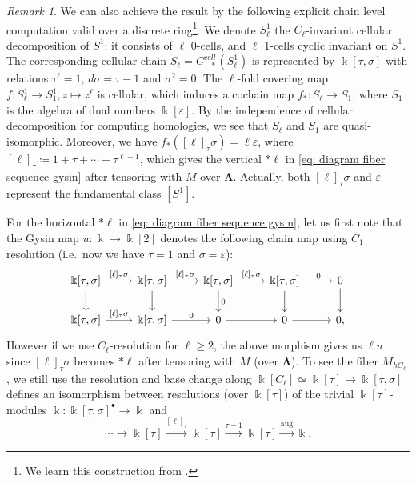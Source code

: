 \documentclass[11pt]{amsart}
\numberwithin{equation}{section}
\theoremstyle{plain}
\theoremstyle{definition}
\theoremstyle{remark}
\newtheorem{RMK}[rmk]{Remark}
\begin{document}
    \begin{RMK} 
    We can also achieve the result by the following explicit chain level computation valid over a discrete ring\footnote{We learn this construction from \cite[Proposition 5.3]{Chen1}.}. We denote $S^1_\ell$ the $C_\ell$-invariant cellular decomposition of $S^1$: it consists of $\ell$ 0-cells, and $\ell$ 1-cells cyclic invariant on $S^1$. The corresponding cellular chain $S_\ell=C_{-*}^{cell}(S^1_\ell)$ is represented by $\Bbbk[\tau,\sigma]$ with relations $\tau^\ell=1$, $d\sigma=\tau-1$ and $\sigma^2=0$. The $\ell$-fold covering map $f:S^1_\ell\rightarrow S^1_1, z\mapsto z^\ell$ is cellular, which induces a cochain map $f_*: S_\ell\rightarrow S_1$, where $S_1$ is the algebra of dual numbers $\Bbbk[\varepsilon]$. By the independence of cellular decomposition for computing homologies, we see that $S_\ell$ and $S_1$ are quasi-isomorphic. 
    Moreover, we have $f_*([\ell]_\tau\sigma)=\ell\varepsilon$, where $[\ell]_\tau\coloneqq 1+\tau+\cdots+\tau^{\ell-1}$, which gives the vertical $*\ell$ in \autoref{eq: diagram fiber sequence gysin} after tensoring with $M$ over $\boldsymbol{\Lambda}$. Actually, both $[\ell]_\tau\sigma$ and $\varepsilon$ represent the fundamental class $[S^1]$.  

    For the horizontal $*\ell$ in \autoref{eq: diagram fiber sequence gysin}, let us first note that the Gysin map $u:\Bbbk\rightarrow \Bbbk[2]$ denotes the following chain map using $C_1$ resolution (i.e.~now we have $\tau=1$ and $\sigma=\varepsilon$): 
    \[\begin{tikzcd}
{\Bbbk[\tau,\sigma]} \arrow[r, "{[\ell]_\tau\sigma}"] \arrow[d] & {\Bbbk[\tau,\sigma]} \arrow[r, "{[\ell]_\tau\sigma}"] \arrow[d] & {\Bbbk[\tau,\sigma]} \arrow[r, "{[\ell]_\tau\sigma}"] \arrow[d, "0"] & {\Bbbk[\tau,\sigma]} \arrow[r, "{0}"] \arrow[d] & 0 \arrow[d] \\
{\Bbbk[\tau,\sigma]} \arrow[r, "{[\ell]_\tau\sigma}"]           & {\Bbbk[\tau,\sigma]} \arrow[r, "{0}"]                             & 0 \arrow[r]                                                          & 0 \arrow[r]                                                       & 0  ,        
\end{tikzcd}\]
However if we use $C_\ell$-resolution for $\ell \geq 2$, the above morphism gives us $\ell u$ since $[\ell]_\tau\sigma$ becomes $*\ell$ after tensoring with $M$ (over ${\boldsymbol{\Lambda}}$). To see the fiber $M_{hC_\ell}$, we still use the resolution and base change along $\Bbbk[C_\ell]\simeq \Bbbk[\tau]\to \Bbbk[\tau,\sigma]$ defines an isomorphism between resolutions (over $\Bbbk[\tau]$) of the trivial $\Bbbk[\tau]$-modules $\Bbbk :\Bbbk[\tau,\sigma]^\bullet\rightarrow\Bbbk$ and 
\[\cdots \rightarrow \Bbbk[\tau]\xrightarrow{[\ell]_\tau}  \Bbbk[\tau]\xrightarrow{\tau-1} \Bbbk[\tau]\xrightarrow{\operatorname{aug}} \Bbbk.\]
\end{RMK}
    
\end{document}

